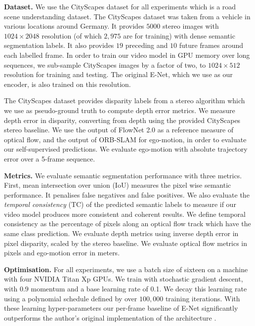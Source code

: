 \textbf{Dataset.} We use the CityScapes dataset for all experiments \citep{Cordts2016Cityscapes} which is a road scene understanding dataset. The CityScapes dataset was taken from a vehicle in various locations around Germany. It provides $5000$ stereo images with $1024 \times 2048$ resolution (of which $2,975$ are for training) with dense semantic segmentation labels. It also provides $19$ preceding and $10$ future frames around each labelled frame.
In order to train our video model in GPU memory over long sequences, we sub-sample CityScapes images by a factor of two, to $1024\times 512$ resolution for training and testing. The original E-Net, which we use as our encoder, is also trained on this resolution.

The CityScapes dataset provides disparity labels from a stereo algorithm \citep{Cordts2016Cityscapes} which we use as pseudo-ground truth to compute depth error metrics. We measure depth error in disparity, converting from depth using the provided CityScapes stereo baseline. We use the output of FlowNet 2.0 \citep{flownet2} as a reference measure of optical flow, and the output of ORB-SLAM \citep{mur2015orb} for ego-motion, in order to evaluate our self-supervised predictions. We evaluate ego-motion with absolute trajectory error over a 5-frame sequence.

\textbf{Metrics.} We evaluate semantic segmentation performance with three metrics. First, mean intersection over union (IoU) measures the pixel wise semantic performance. It penalises false negatives and false positives. We also evaluate the \textit{temporal consistency} (TC) of the predicted semantic labels to measure if our video model produces more consistent and coherent results. We define temporal consistency as the percentage of pixels along an optical flow track which have the same class prediction. We evaluate depth metrics using inverse depth error in pixel disparity, scaled by the stereo baseline. We evaluate optical flow metrics in pixels and ego-motion error in meters.

\textbf{Optimisation.} For all experiments, we use a batch size of sixteen on a machine with four NVIDIA Titan Xp GPUs. We train with stochastic gradient descent, with $0.9$ momentum and a base learning rate of 0.1. We decay this learning rate using a polynomial schedule defined by \citep{chen14semantic} over $100,000$ training iterations. With these learning hyper-parameters our per-frame baseline of E-Net significantly outperforms the author's original implementation of the architecture \citep{paszke2016enet}.

